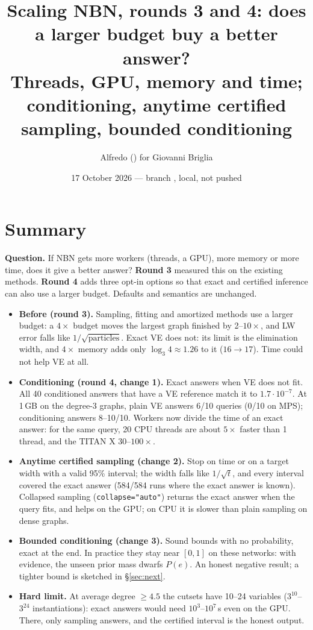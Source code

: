 \documentclass[10pt,a4paper]{article}
\title{\textbf{Scaling NBN, rounds 3 and 4: does a larger budget buy a better answer?}\\[4pt]
\large Threads, GPU, memory and time; conditioning, anytime certified sampling, bounded conditioning}
\author{Alfredo (\code{alfredo\_claude}) for Giovanni Briglia}
\date{17 October 2026 --- branch \code{feat/scaling-mechanisms}, local, not pushed}
\newcommand{\code}[1]{\texttt{#1}}
\begin{document}
\maketitle

\section*{Summary}
\textbf{Question.} If NBN gets more workers (threads, a GPU), more memory or more time, does it
give a better answer? \textbf{Round 3} measured this on the existing methods. \textbf{Round 4}
adds three opt-in options so that exact and certified inference can also use a larger budget.
Defaults and semantics are unchanged.
\begin{itemize}
\item \textbf{Before (round 3).} Sampling, fitting and amortized methods use a larger budget: a
$4\times$ budget moves the largest graph finished by 2--$10\times$, and LW error falls like
$1/\sqrt{\text{particles}}$. Exact VE does not: its limit is the elimination width, and $4\times$
memory adds only $\log_3 4\approx1.26$ to it ($16\to17$). Time could not help VE at all.
\item \textbf{Conditioning (round 4, change 1).} Exact answers when VE does not fit. All 40
conditioned answers that have a VE reference match it to $1.7\cdot10^{-7}$. At 1\,GB on the
degree-3 graphs, plain VE answers 6/10 queries (0/10 on MPS); conditioning answers 8--10/10.
Workers now divide the time of an exact answer: for the same query, 20 CPU threads are about
$5\times$ faster than 1 thread, and the TITAN X 30--$100\times$.
\item \textbf{Anytime certified sampling (change 2).} Stop on time or on a target width with a
valid 95\% interval; the width falls like $1/\sqrt{t}$, and every interval covered the exact
answer (584/584 runs where the exact answer is known). Collapsed sampling (\code{collapse="auto"}) returns the exact answer when the
query fits, and helps on the GPU; on CPU it is slower than plain sampling on dense graphs.
\item \textbf{Bounded conditioning (change 3).} Sound bounds with no probability, exact at the
end. In practice they stay near $[0,1]$ on these networks: with evidence, the unseen prior mass
dwarfs $P(e)$. An honest negative result; a tighter bound is sketched in §\ref{sec:next}.
\item \textbf{Hard limit.} At average degree $\ge4.5$ the cutsets have 10--24 variables
($3^{10}$--$3^{24}$ instantiations): exact answers would need $10^3$--$10^7$\,s even on the GPU.
There, only sampling answers, and the certified interval is the honest output.
\end{itemize}
\end{document}

